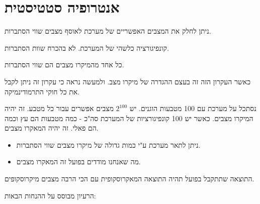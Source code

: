 \documentclass{tstextbook}
\begin{document}

\section{אנטרופיה סטטיסטית}

\begin{definition}
ניתן לחלק את המצבים האפשריים של מערכת לאוסף מצבים שווי הסתברות.

\end{definition}
\begin{definition}
קונפיגורציה כלשהי של המערכת. לא בהכרח שוות הסתברות.

\end{definition}
\begin{theorem}
כל אחד מהמיקרו מצבים הם שווי הסתברות.

\end{theorem}
כאשר העקרון הזה זה בעצם ההגדרה של מיקרו מצב. ולמעשה נראה כי עקרון זה ניתן לקבל את כל חוקי התרמודינמיקה.

\begin{example}
נסתכל על מערכת עם 100 מטבעות הוגנים. יש \(2^{100}\) מצבים אפשרים עבור כל מטבע. זה יהיה המיקרו מצבים.
כאשר יש 100 קונפיגורציות של המערכת סה"כ - כמה מטבעות הם עץ וכמה הם פאלי. זה יהיה המאקרו מצבים.

\end{example}
\begin{corollary}
  \begin{itemize}
    \item ניתן לתאר מערכת ע"י כמות גדולה של מיקרו מצבים שווי הסתברות.
    \item מה שאנחנו מודדים בפועל זה המאקרו מצבים.
  \end{itemize}
\end{corollary}
\begin{proposition}
התוצאה שתתקבל בפועל תהיה התוצאה המאקרוסקופית עם הכי הרבה מצבים מיקרוסקופים.

\end{proposition}
הרעיון מבוסס על ההנחות הבאות:
\end{document}
